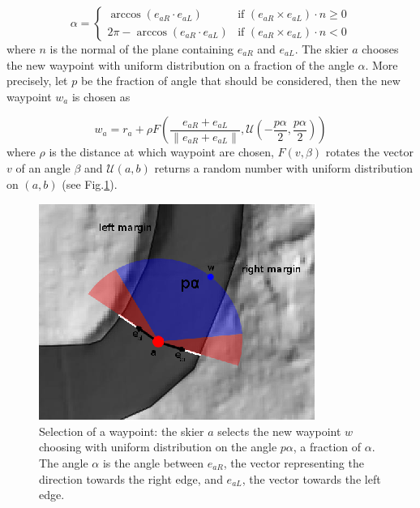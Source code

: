\documentclass[12pt,a4paper,twoside]{book}
\newcommand{\norm}[1]{\lVert#1\rVert}
\begin{document}
\begin{equation}
\alpha=\begin{cases}
  \arccos(e_{aR} \cdot e_{aL}) & \text{if } (e_{aR} \times e_{aL})\cdot n \ge 0 \\
  2\pi-\arccos(e_{aR} \cdot e_{aL}) & \text {if } (e_{aR} \times e_{aL})\cdot n < 0
\end{cases}
\end{equation}
where $n$ is the normal of the plane containing $e_{aR}$ and $e_{aL}$. The skier $a$ chooses the new waypoint with uniform distribution on a fraction of the angle $\alpha$. More precisely, let $p$ be the fraction of angle that should be considered, then the new waypoint $w_a$ is chosen as

\begin{equation}\label{new_waypoint}
w_a=r_a+\rho F\left(\frac{e_{aR}+e_{aL}}{\norm{e_{aR}+e_{aL}}},\mathcal{U}\left(-\frac{p \alpha}{2},\frac{p \alpha}{2}\right)\right)
\end{equation}
where $\rho$ is the distance at which waypoint are chosen, $F\left(v,\beta\right)$ rotates the vector $v$ of an angle $\beta$ and $\mathcal{U}(a,b)$ returns a random number with uniform distribution on $(a,b)$ (see Fig.\ref{new_waypoint_pic}).

\begin{figure}
  \begin{center}
    \includegraphics[width=\textwidth]{images/waypoint_new.eps}
    \caption{Selection of a waypoint: the skier $a$ selects the new waypoint $w$ choosing with uniform distribution on the angle $p\alpha$, a fraction of $\alpha$. The angle $\alpha$ is the angle between $e_{aR}$, the vector representing the direction towards the right edge, and $e_{aL}$, the vector towards the left edge.}\label{new_waypoint_pic}
  \end{center}
\end{figure}
\end{document}
